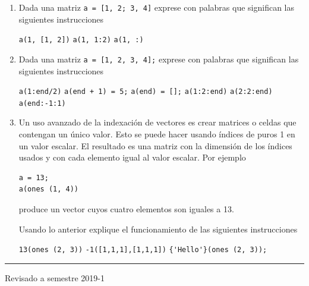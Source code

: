 \documentclass[letter,11pt]{article}
\newcommand\0{\mathbf{0}}
\begin{document}
\begin{enumerate}
\item Dada una matriz
\verb"a = [1, 2; 3, 4]"
exprese con palabras que significan las siguientes instrucciones
\begin{center}
\verb"a(1, [1, 2])" \hspace{1cm}
\verb"a(1, 1:2)"    \hspace{1cm}
\verb"a(1, :)"      \hspace{1cm}
\end{center}

\item Dada una matriz
\verb"a = [1, 2, 3, 4];"
exprese con palabras que significan las siguientes instrucciones
\begin{center}
\verb"a(1:end/2)"        \hspace{3mm}
\verb"a(end + 1) = 5;"   \hspace{3mm}
\verb"a(end) = [];"      \hspace{3mm}
\verb"a(1:2:end)"        \hspace{3mm}
\verb"a(2:2:end)"        \hspace{3mm}
\verb"a(end:-1:1)"       \hspace{3mm}
\end{center}

\item Un uso avanzado de la indexaci\'on de vectores es crear matrices o celdas que contengan un \'unico valor. Esto se puede hacer usando \'indices de puros 1 en un valor escalar. El resultado es una matriz con la dimensi\'on de los \'indices usados y con cada elemento igual al valor escalar. Por ejemplo
\begin{lstlisting}
a = 13;
a(ones (1, 4))
\end{lstlisting}
produce un vector cuyos cuatro elementos son iguales a 13.

Usando lo anterior explique el funcionamiento de las siguientes instrucciones
\begin{center}		
\verb"13(ones (2, 3))"			\hspace{5mm}
\verb"-1([1,1,1],[1,1,1])"		\hspace{5mm}
\verb"{'Hello'}(ones (2, 3));"	\hspace{5mm}
\end{center}
\end{enumerate}

\vfill
\hrule
\par
\medskip
 \hfill Revisado a semestre 2019-1
\end{document}

